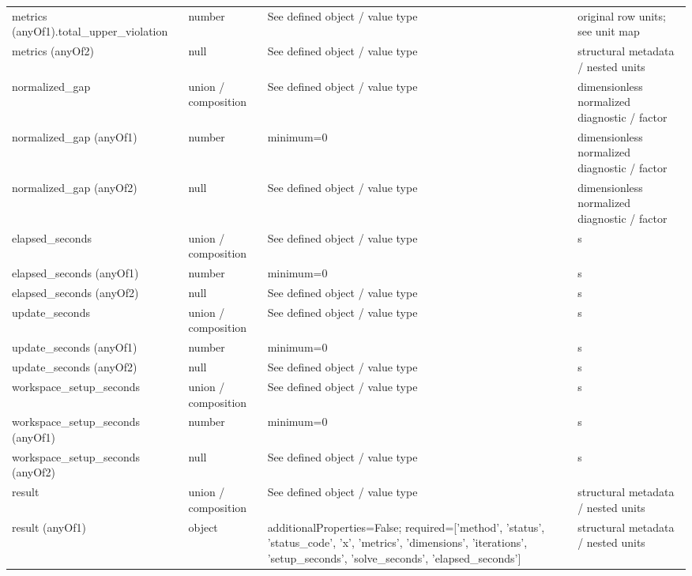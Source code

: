 \begin{longtable}{@{}>{\raggedright\arraybackslash}p{}>{\raggedright\arraybackslash}p{}>{\raggedright\arraybackslash}p{}>{\raggedright\arraybackslash}p{}@{}}
metrics (anyOf1).\allowbreak{}total\_\allowbreak{}upper\_\allowbreak{}violation & number & See defined object /\allowbreak{} value type & original row units; see unit map\\
metrics (anyOf2) & null & See defined object /\allowbreak{} value type & structural metadata /\allowbreak{} nested units\\
normalized\_\allowbreak{}gap & union /\allowbreak{} composition & See defined object /\allowbreak{} value type & dimensionless normalized diagnostic /\allowbreak{} factor\\
normalized\_\allowbreak{}gap (anyOf1) & number & minimum=\allowbreak{}0 & dimensionless normalized diagnostic /\allowbreak{} factor\\
normalized\_\allowbreak{}gap (anyOf2) & null & See defined object /\allowbreak{} value type & dimensionless normalized diagnostic /\allowbreak{} factor\\
elapsed\_\allowbreak{}seconds & union /\allowbreak{} composition & See defined object /\allowbreak{} value type & s\\
elapsed\_\allowbreak{}seconds (anyOf1) & number & minimum=\allowbreak{}0 & s\\
elapsed\_\allowbreak{}seconds (anyOf2) & null & See defined object /\allowbreak{} value type & s\\
update\_\allowbreak{}seconds & union /\allowbreak{} composition & See defined object /\allowbreak{} value type & s\\
update\_\allowbreak{}seconds (anyOf1) & number & minimum=\allowbreak{}0 & s\\
update\_\allowbreak{}seconds (anyOf2) & null & See defined object /\allowbreak{} value type & s\\
workspace\_\allowbreak{}setup\_\allowbreak{}seconds & union /\allowbreak{} composition & See defined object /\allowbreak{} value type & s\\
workspace\_\allowbreak{}setup\_\allowbreak{}seconds (anyOf1) & number & minimum=\allowbreak{}0 & s\\
workspace\_\allowbreak{}setup\_\allowbreak{}seconds (anyOf2) & null & See defined object /\allowbreak{} value type & s\\
result & union /\allowbreak{} composition & See defined object /\allowbreak{} value type & structural metadata /\allowbreak{} nested units\\
result (anyOf1) & object & additionalProperties=\allowbreak{}False; required=\allowbreak{}['method', 'status', 'status\_\allowbreak{}code', 'x', 'metrics', 'dimensions', 'iterations', 'setup\_\allowbreak{}seconds', 'solve\_\allowbreak{}seconds', 'elapsed\_\allowbreak{}seconds'] & structural metadata /\allowbreak{} nested units\\

\end{longtable}
